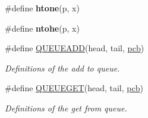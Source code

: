 \begin{DoxyCompactItemize}
\item 
\#define {\bfseries htone}(p,  x)
\item 
\#define {\bfseries ntohe}(p,  x)
\item 
\#define \hyperlink{group__enet__rtcs__adaptor_ga59342d5298b9947ed997410f3a8d2a34}{Q\+U\+E\+U\+E\+A\+DD}(head,  tail,  \hyperlink{structpcb}{pcb})
\begin{DoxyCompactList}\small\item\em Definitions of the add to queue. \end{DoxyCompactList}\item 
\#define \hyperlink{group__enet__rtcs__adaptor_ga43200c39154300a2da4aac8725fb4af0}{Q\+U\+E\+U\+E\+G\+ET}(head,  tail,  \hyperlink{structpcb}{pcb})
\begin{DoxyCompactList}\small\item\em Definitions of the get from queue. \end{DoxyCompactList}\end{DoxyCompactItemize}
